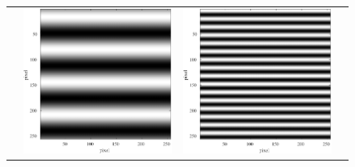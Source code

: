 \begin{figure}[H]
\begin{tabularx}{\textwidth}{p{}CCC}
        \begin{minipage}{.05\textwidth}
            \centering
        \end{minipage}                                                         &
        \begin{minipage}{.25\textwidth}
            \centering
            \includegraphics[width=.9\textwidth,keepaspectratio]{../../Figures/08_21_img4.pdf}
        \end{minipage}      &
        \begin{minipage}{.25\textwidth}
            \centering
            \includegraphics[width=.9\textwidth,keepaspectratio]{../../Figures/08_22_img16.pdf}

\end{minipage}
\end{tabularx}
\end{figure}
